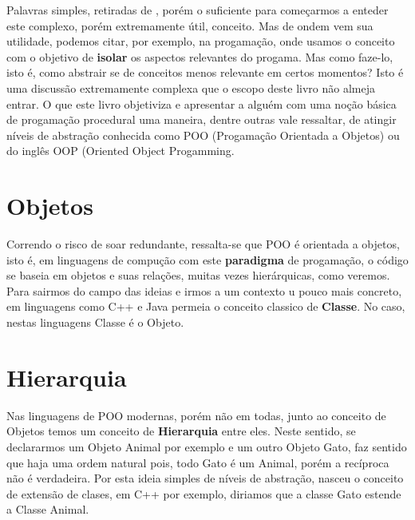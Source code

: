 \documentclass{amsbook}
\begin{document}
	Palavras simples, retiradas de \cite{sussaneklanger}, porém o suficiente para começarmos a enteder este complexo, porém extremamente útil, conceito. Mas de ondem vem sua utilidade, podemos citar, por exemplo, na progamação, onde usamos o conceito com o objetivo de \textbf{isolar} os aspectos relevantes do progama. Mas como faze-lo, isto é, como abstrair se de conceitos menos relevante em certos momentos? Isto é uma discussão extremamente complexa que o escopo deste livro não almeja entrar. O que este livro objetiviza e apresentar a alguém com uma noção básica de progamação procedural uma maneira, dentre outras vale ressaltar, de atingir níveis de abstração conhecida como POO (Progamação Orientada a Objetos) ou do inglês OOP (Oriented Object Progamming.

\section{Objetos}
	Correndo o risco de soar redundante, ressalta-se que POO é orientada a objetos, isto é, em linguagens de compução com este \textbf{paradigma} de progamação, o código se baseia em objetos e suas relações, muitas vezes  hierárquicas, como veremos. Para sairmos do campo das ideias e irmos a um contexto u pouco mais concreto, em linguagens como C++ e Java permeia o conceito classico de \textbf{Classe}. No caso, nestas linguagens Classe é o Objeto.

\section{Hierarquia}
	Nas linguagens de POO modernas, porém não em todas, junto ao conceito de Objetos temos um conceito de \textbf{Hierarquia} entre eles. Neste sentido, se declararmos um Objeto Animal por exemplo e um outro Objeto Gato, faz sentido que haja uma ordem natural pois, todo Gato é um Animal, porém a recíproca não é verdadeira. Por esta ideia simples de níveis de abstração, nasceu o conceito de extensão de clases, em C++ por exemplo, diriamos que a classe Gato estende a Classe Animal.
\end{document}
